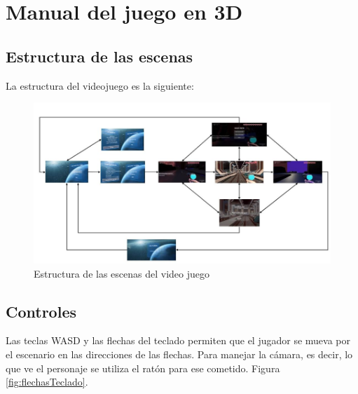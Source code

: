\chapter{Manual del juego en 3D}

\section{Estructura de las escenas}

La estructura del videojuego es la siguiente: 

\begin{figure}[H]
	\centering
	\includegraphics[scale=0.60]{imagenes/estructuraEscena3D.png}
	\caption{\label{fig:EstructuraEscena3D}Estructura de las escenas del video juego}
\end{figure}

\section{Controles}

Las teclas WASD y las flechas del teclado permiten que el jugador se mueva por el escenario en las direcciones de las flechas. Para manejar la cámara, es decir, lo que ve el personaje se utiliza el ratón para ese cometido. Figura \ref{fig:flechasTeclado}.


